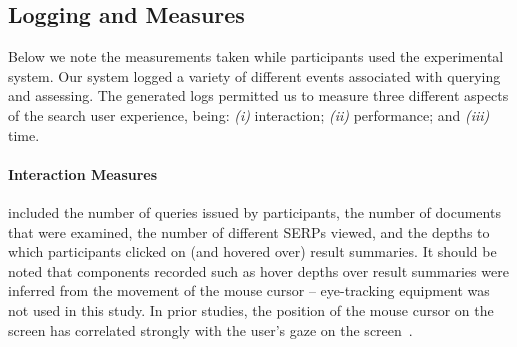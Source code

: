 



\subsection{Logging and Measures}\label{sec:method:behaviours}
Below we note the measurements taken while participants used the experimental system.
Our system logged a variety of different events associated with querying and assessing. The generated logs permitted us to measure three different aspects of the search user experience, being: \emph{(i)} interaction; \emph{(ii)} performance; and \emph{(iii)} time. 

\paragraph{Interaction Measures} included the number of queries issued by participants, the number of documents that were examined, the number of different SERPs viewed, and the depths to which participants clicked on (and hovered over) result summaries. It should be noted that components recorded such as hover depths over result summaries were inferred from the movement of the mouse cursor -- eye-tracking equipment was not used in this study. In prior studies, the position of the mouse cursor on the screen has correlated strongly with the user's gaze on the screen~\cite{chen2001mouse_cursor,smucker2014judging_relevance_movements}.
\vspace*{2mm}

